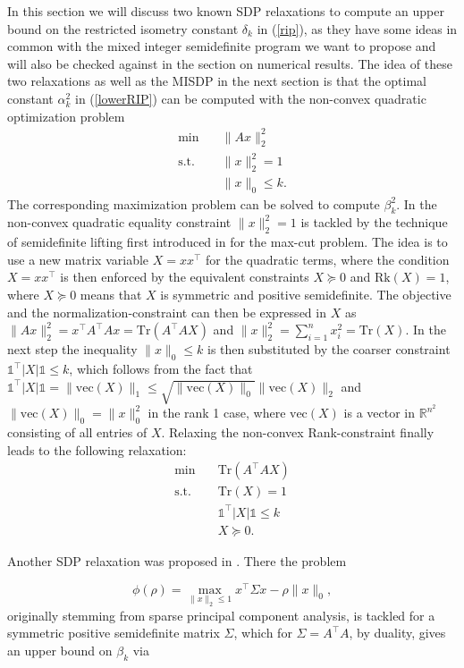 \documentclass[a4paper,11pt,1p]{elsarticle}
\newcommand{\abs}[1]{\lvert{#1}\rvert}
\newcommand{\Norm}[2]{\lVert{#1}\rVert_{#2}}
\newcommand{\T}{^{\top}}
\newcommand{\Tr}{\text{Tr}}
\newcommand{\Rk}{\text{Rk}}
\newcommand{\vect}{\text{vec}}
\newcommand{\R}{\mathds{R}}
\newcommand{\ones}{\mathds{1}}
\begin{document}
In this section we will discuss two known SDP relaxations to compute an upper bound on the restricted isometry constant $\delta_k$ in (\ref{rip}), as they have some ideas in common with the mixed integer semidefinite program we want to 
propose and will also be checked against in the section on numerical results. The idea of these two relaxations as well as the MISDP in the next section is that the optimal constant $\alpha_k^2$ in (\ref{lowerRIP}) can be computed
with the non-convex quadratic optimization problem
\begin{align}\label{QP}
 \min \quad & \Norm{Ax}{2}^2 \nonumber \\
 \text{s.t.} \quad & \Norm{x}{2}^2 = 1 \tag{QP} \\
 & \Norm{x}{0} \leq k. \nonumber
\end{align}
The corresponding maximization problem can be solved to compute $\beta_k^2$. In \cite{Asp07} the non-convex quadratic equality constraint $\Norm{x}{2}^2 = 1$ is tackled by the technique of semidefinite lifting first introduced in \cite{GW95} 
for the max-cut problem. The idea is to use a new matrix variable $X=xx\T$ for the quadratic terms, where the condition $X=xx\T$ is then enforced by the equivalent constraints $X \succeq 0$ and $\Rk(X) = 1$, where 
$X \succeq 0$ means that $X$ is symmetric and positive semidefinite. The objective and the normalization-constraint can then be expressed in $X$ as  $\Norm{Ax}{2}^2 = x\T A\T Ax =
\Tr(A\T A X)$ and $\Norm{x}{2}^2 = \sum_{i=1}^n x_i^2 = \Tr(X)$. In the
next step the inequality $\Norm{x}{0} \leq k$ is then substituted by the coarser constraint $\ones\T
\abs{X} \ones \leq k$, which follows from the fact that $\ones\T\abs{X} \ones = \Norm{\vect(X)}{1}\leq \sqrt{\Norm{\vect(X)}{0}} \Norm{\vect(X)}{2}$ and $\Norm{\vect(X)}{0}=\Norm{x}{0}^2$ in the rank 1 case, where $\vect(X)$ is a vector
in $\R^{n^2}$ consisting of all entries of $X$. 
Relaxing the non-convex Rank-constraint finally leads to the following relaxation:
\begin{align}\label{Asp07}
 \min \quad & \Tr(A\T A X) \nonumber \\
 \text{s.t.} \quad & \Tr(X) = 1 \nonumber \\
 & \ones\T \abs{X} \ones \leq k \tag{A1} \\
 & X \succeq 0. \nonumber
\end{align}

Another SDP relaxation was proposed in \cite{Asp08}. There the problem

\begin{equation}\label{phi}
 \phi(\rho) = \max_{\Norm{x}{2} \leq 1} x\T \Sigma x - \rho \Norm{x}{0},
\end{equation}
originally stemming from sparse principal component analysis, is tackled for a symmetric positive semidefinite matrix $\Sigma$, which for
$\Sigma = A\T A$, by duality, gives an upper bound on $\beta_k$ via 
\end{document}
